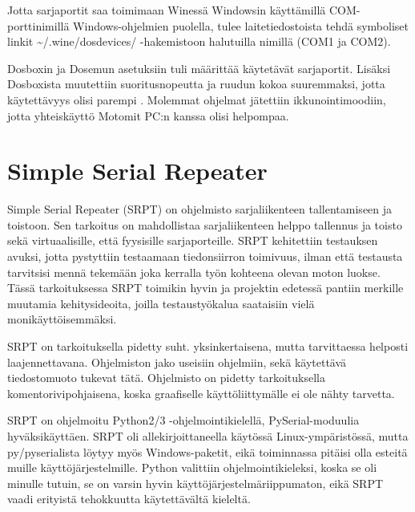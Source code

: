 Jotta sarjaportit saa toimimaan Winessä Windowsin käyttämillä COM-porttinimillä Windows-ohjelmien puolella, tulee laitetiedostoista tehdä symboliset linkit \textasciitilde{}/.wine/dosdevices/ -hakemistoon halutuilla nimillä (COM1 ja COM2).\cite[s. 21]{wine:manual}

Dosboxin ja Dosemun asetuksiin tuli määrittää käytetävät sarjaportit. Lisäksi Dosboxista muutettiin suoritusnopeutta ja ruudun kokoa suuremmaksi, jotta käytettävyys olisi parempi \cite{dosbox:conf}. Molemmat ohjelmat jätettiin ikkunointimoodiin, jotta yhteiskäyttö Motomit PC:n kanssa olisi helpompaa.


\section{Simple Serial Repeater}

Simple Serial Repeater (SRPT) on ohjelmisto sarjaliikenteen tallentamiseen ja toistoon. Sen tarkoitus on mahdollistaa sarjaliikenteen helppo tallennus ja toisto sekä virtuaalisille, että fyysisille sarjaporteille. SRPT kehitettiin testauksen avuksi, jotta pystyttiin testaamaan tiedonsiirron toimivuus, ilman että testausta tarvitsisi mennä tekemään joka kerralla työn kohteena olevan moton luokse. Tässä tarkoituksessa SRPT toimikin hyvin ja projektin edetessä pantiin merkille muutamia kehitysideoita, joilla testaustyökalua saataisiin vielä monikäyttöisemmäksi.

SRPT on tarkoituksella pidetty suht. yksinkertaisena, mutta tarvittaessa helposti laajennettavana. Ohjelmiston jako useisiin ohjelmiin, sekä käytettävä tiedostomuoto tukevat tätä. Ohjelmisto on pidetty tarkoituksella komentorivipohjaisena, koska graafiselle käyttöliittymälle ei ole nähty tarvetta.

SRPT on ohjelmoitu Python2/3 -ohjelmointikielellä, PySerial-moduulia hyväksikäyttäen. SRPT oli allekirjoittaneella käytössä Linux-ympäristössä, mutta py/pyserialista löytyy myös Windows-paketit, eikä toiminnassa pitäisi olla esteitä muille käyttöjärjestelmille. Python valittiin ohjelmointikieleksi, koska se oli minulle tutuin, se on varsin hyvin käyttöjärjestelmäriippumaton, eikä SRPT vaadi erityistä tehokkuutta käytettävältä kieleltä.

